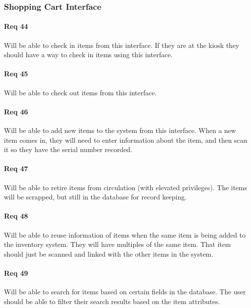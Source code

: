 \documentclass[10pt, onecolumn, twoside, peerreview]{IEEEtran}
\begin{document}
\subsubsection{Shopping Cart Interface}
\paragraph*{Req 44} Will be able to check in items from this interface. If they are at the kiosk they should have a way to check in items
using this interface.\\

\paragraph*{Req 45} Will be able to check out items from this interface.\\

\paragraph*{Req 46} Will be able to add new items to the system from this interface. When a new item comes in, they will need to enter
information about the item, and then scan it so they have the serial number recorded.\\

\paragraph*{Req 47} Will be able to retire items from circulation (with elevated privileges). The items will be scrapped, but still in the
database for record keeping.\\

\paragraph*{Req 48} Will be able to reuse information of items when the same item is being added to the inventory system. They will have
multiples of the same item. That item should just be scanned and linked with the other items in the system.\\

\paragraph*{Req 49} Will be able to search for items based on certain fields in the database. The user should be able to filter their
search results based on the item attributes.\\
\end{document}
